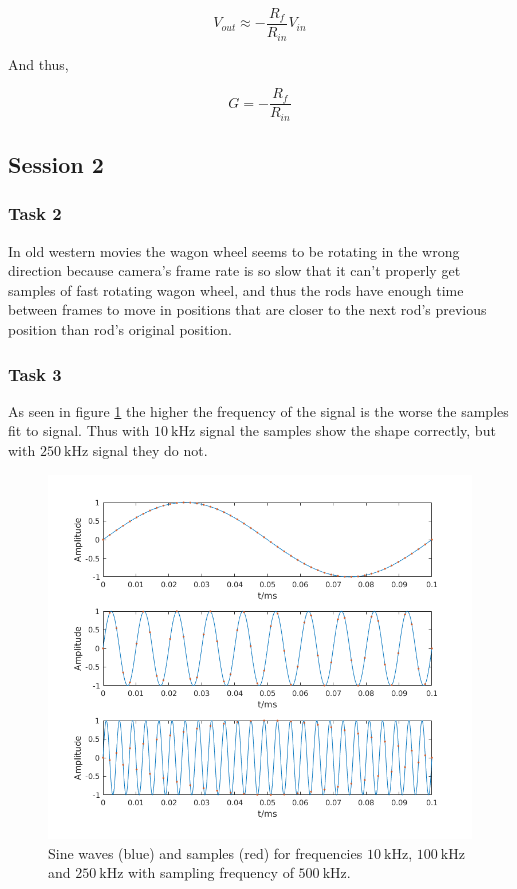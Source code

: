\documentclass[12pt]{article}
\begin{document}
\begin{equation*}
V_{out} \approx -\frac{R_f}{R_{in}} V_{in}
\end{equation*}

And thus,

\begin{equation}
G = -\frac{R_f}{R_{in}}
\label{eqn:G}
\end{equation}

\subsection{Session 2}

\subsubsection{Task 2}

In old western movies the wagon wheel seems to be rotating in the wrong direction because camera's frame rate is so slow that it can't properly get samples of fast rotating wagon wheel, and thus the rods have enough time between frames to move in positions that are closer to the next rod's previous position than rod's original position.

\subsubsection{Task 3}

As seen in figure \ref{fig:samp} the higher the frequency of the signal is the worse the samples fit to signal. Thus with $\SI{10}{\kilo\hertz}$ signal the samples show the shape correctly, but with $\SI{250}{\kilo\hertz}$ signal they do not.

\begin{figure}[!ht]
\centering
\includegraphics[width = \textwidth]{kuvat/sampling.png}
\caption{Sine waves (blue) and samples (red) for frequencies $\SI{10}{\kilo\hertz}$, $\SI{100}{\kilo\hertz}$ and $\SI{250}{\kilo\hertz}$ with sampling frequency of $\SI{500}{\kilo\hertz}$.}
\label{fig:samp}
\end{figure}
\end{document}
